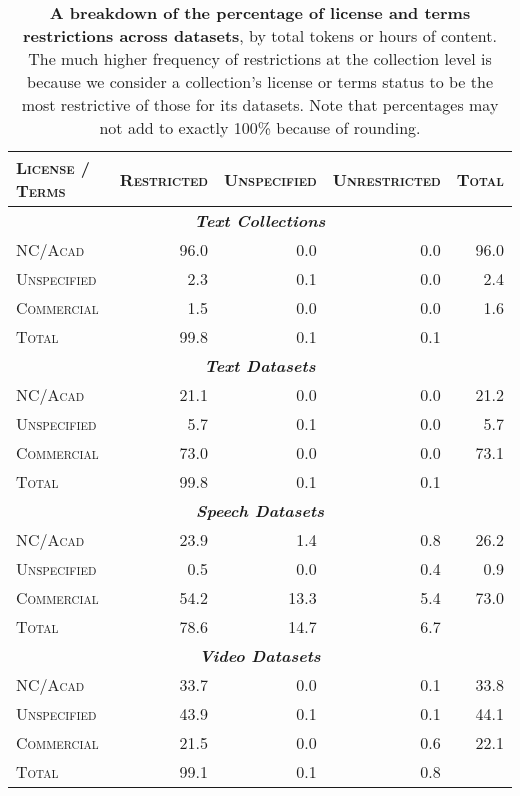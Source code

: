 \begin{table*}[!htb]
\centering
\begin{adjustbox}{width=0.9\textwidth}
\begin{tabular}{l|rrr|r}
\toprule
\textsc{License / Terms} & \textsc{Restricted} & \textsc{Unspecified} & \textsc{Unrestricted} & \textsc{Total} \\
\midrule
\multicolumn{5}{c}{\textbf{\emph{Text Collections}}} \\
\midrule
\textsc{NC/Acad} & 96.0 & 0.0 & 0.0 & 96.0 \\
\textsc{Unspecified} & 2.3 & 0.1 & 0.0 & 2.4 \\
\textsc{Commercial} &1.5 & 0.0 & 0.0 & 1.6 \\
\midrule
\textsc{Total} & 99.8 & 0.1 & 0.1 & \\
\midrule
\multicolumn{5}{c}{\textbf{\emph{Text Datasets}}} \\
\midrule
\textsc{NC/Acad} & 21.1 & 0.0 & 0.0 & 21.2 \\
\textsc{Unspecified} & 5.7 & 0.1 & 0.0 & 5.7 \\
\textsc{Commercial} & 73.0 & 0.0 & 0.0 & 73.1 \\
\midrule
\textsc{Total} & 99.8 & 0.1 & 0.1 & \\
\midrule
\multicolumn{5}{c}{\textbf{\emph{Speech Datasets}}} \\
\midrule
\textsc{NC/Acad} & 23.9 & 1.4 & 0.8 & 26.2 \\
\textsc{Unspecified} & 0.5 & 0.0 & 0.4 & 0.9 \\
\textsc{Commercial} & 54.2 & 13.3 & 5.4 & 73.0 \\
\midrule
\textsc{Total} & 78.6 & 14.7 & 6.7 & \\
\midrule
\multicolumn{5}{c}{\textbf{\emph{Video Datasets}}} \\
\midrule
\textsc{NC/Acad} & 33.7 & 0.0 & 0.1 & 33.8 \\
\textsc{Unspecified} & 43.9 & 0.1 & 0.1 & 44.1 \\
\textsc{Commercial} & 21.5 & 0.0 & 0.6 & 22.1 \\
\midrule
\textsc{Total} & 99.1 & 0.1 & 0.8 & \\
\bottomrule
\end{tabular}
\end{adjustbox}
\caption{\textbf{A breakdown of the percentage of license and terms restrictions across datasets}, by total tokens or hours of content. The much higher frequency of restrictions at the collection level is because we consider a collection's license or terms status to be the most restrictive of those for its datasets. Note that percentages may not add to exactly 100\% because of rounding. 
}
\label{tab:license_terms_breakdown}
\vspace{-2mm}
\end{table*}
